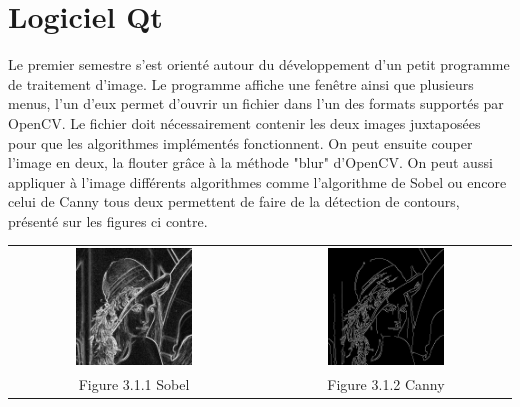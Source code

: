 \documentclass[12pt,a4paper]{report}
\begin{document}
\section{Logiciel Qt}
Le premier semestre s'est orienté autour du développement d'un petit programme de traitement d'image. Le programme affiche une fenêtre ainsi que plusieurs menus, l'un d'eux permet d'ouvrir un fichier dans l'un des formats supportés par OpenCV.
Le fichier doit nécessairement contenir les deux images juxtaposées pour que les algorithmes implémentés fonctionnent. On peut ensuite couper l'image en deux, la flouter grâce à la méthode "blur" d'OpenCV. On peut aussi appliquer à l'image différents algorithmes comme l'algorithme de Sobel ou encore celui de Canny tous deux permettent de faire de la détection de contours, présenté sur les figures ci contre.
\begin{center}
\begin{tabular}{cc}
  \vspace{0pt} \includegraphics[width=0.49\textwidth]{sobel.jpg} &
  \vspace{0pt} \includegraphics[width=0.49\textwidth]{canny.jpg} \\
    
  Figure 3.1.1 Sobel & Figure 3.1.2 Canny
\end{tabular}
\end{center}
\end{document}
